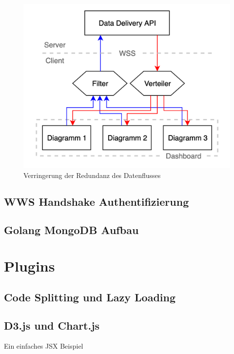 \begin{figure}
    \label{figure:uebersichtderdatenauslieferung}
    \begin{center}
    \includegraphics[scale=0.2]{img/Verteilung}
    \end{center}
    \caption{Verringerung der Redundanz des Datenflusses}
\end{figure}

\subsection{WWS Handshake Authentifizierung}
\subsection{Golang MongoDB Aufbau}

\section{Plugins}
\subsection{Code Splitting und Lazy Loading}
\subsection{D3.js und Chart.js}
\begin{listing}
    \label{lst:HelloJSX}
    \caption{Ein einfaches JSX Beispiel}
    \inputminted{jsx}{snippets/examples/Welcome.jsx}
\end{listing}

